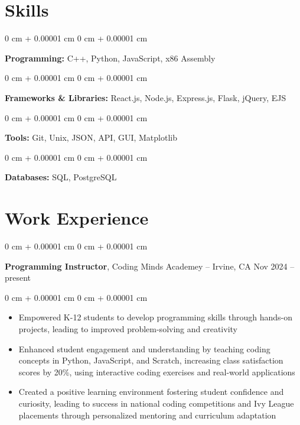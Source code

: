 \documentclass[10pt, letterpaper]{article}
\newenvironment{highlights}{
    \begin{itemize}[
        topsep=0.10 cm,
        parsep=0.10 cm,
        partopsep=0pt,
        itemsep=0pt,
        leftmargin=0 cm + 10pt
    ]
}{
    \end{itemize}
} %
\newenvironment{onecolentry}{
    \begin{adjustwidth}{
        0 cm + 0.00001 cm
    }{
        0 cm + 0.00001 cm
    }
}{
    \end{adjustwidth}
} %
\newenvironment{twocolentry}[2][]{
    \onecolentry
    \def\secondColumn{#2}
    \setcolumnwidth{\fill, 4.5 cm}
    \begin{paracol}{2}
}{
    \switchcolumn \raggedleft \secondColumn
    \end{paracol}
    \endonecolentry
} %
\begin{document}
    
    \section{Skills}



        
        \begin{onecolentry}
            \textbf{Programming:} C++, Python, JavaScript, x86 Assembly
        \end{onecolentry}

        \vspace{0.2 cm}

        \begin{onecolentry}
            \textbf{Frameworks \& Libraries:} React.js, Node.js, Express.js, Flask, jQuery, EJS
        \end{onecolentry}

        \vspace{0.2 cm}

        \begin{onecolentry}
            \textbf{Tools:} Git, Unix, JSON, API, GUI, Matplotlib
        \end{onecolentry}

        \vspace{0.2 cm}

        \begin{onecolentry}
            \textbf{Databases:} SQL, PostgreSQL
        \end{onecolentry}


    
    \section{Work Experience}



        
        \begin{twocolentry}{
            Nov 2024 – present
        }
            \textbf{Programming Instructor}, Coding Minds Academey -- Irvine, CA\end{twocolentry}

        \vspace{0.10 cm}
        \begin{onecolentry}
            \begin{highlights}
                \item Empowered K-12 students to develop programming skills through hands-on projects, leading to improved problem-solving and creativity
                \item Enhanced student engagement and understanding by teaching coding concepts in Python, JavaScript, and Scratch, increasing class satisfaction scores by 20\%, using interactive coding exercises and real-world applications
                \item Created a positive learning environment fostering student confidence and curiosity, leading to success in national coding competitions and Ivy League placements through personalized mentoring and curriculum adaptation
            \end{highlights}
        \end{onecolentry}
\end{document}
